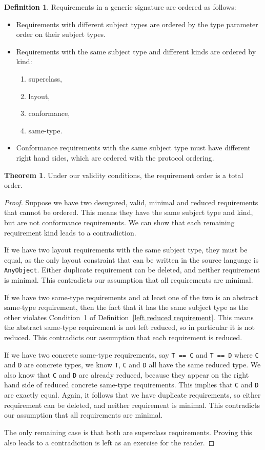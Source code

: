 \documentclass[a4paper,headsepline,bibliography=totoc,toc=flat,fleqn,twoside=semi]{scrbook}
\theoremstyle{definition}
\newtheorem{definition}{Definition}[chapter]
\theoremstyle{definition}
\theoremstyle{definition}
\newtheorem{theorem}{Theorem}[chapter]
\begin{document}
\begin{definition}\label{requirement order}
Requirements in a generic signature are ordered as follows:
\begin{itemize}
\item Requirements with different subject types are ordered by the type parameter order on their subject types.
\item Requirements with the same subject type and different kinds are ordered by kind:
\begin{enumerate}
\item superclass,
\item layout,
\item conformance,
\item same-type.
\end{enumerate}
\item Conformance requirements with the same subject type must have different right hand sides, which are ordered with the protocol ordering.
\end{itemize}
\end{definition}
\begin{theorem}
Under our validity conditions, the requirement order is a total order.
\end{theorem}
\begin{proof}
Suppose we have two desugared, valid, minimal and reduced requirements that cannot be ordered. This means they have the same subject type and kind, but are not conformance requirements. We can show that each remaining requirement kind leads to a contradiction.

If we have two layout requirements with the same subject type, they must be equal, as the only layout constraint that can be written in the source language is \texttt{AnyObject}. Either duplicate requirement can be deleted, and neither requirement is minimal. This contradicts our assumption that all requirements are minimal.

If we have two same-type requirements and at least one of the two is an abstract same-type requirement, then the fact that it has the same subject type as the other violates Condition~1 of Definition~\ref{left reduced requirement}. This means the abstract same-type requirement is not left reduced, so in particular it is not reduced. This contradicts our assumption that each requirement is reduced.

If we have two concrete same-type requirements, say \texttt{T == C} and \texttt{T == D} where \texttt{C} and \texttt{D} are concrete types, we know \texttt{T}, \texttt{C} and \texttt{D} all have the same reduced type. We also know that \texttt{C} and \texttt{D} are already reduced, because they appear on the right hand side of reduced concrete same-type requirements. This implies that \texttt{C} and \texttt{D} are exactly equal. Again, it follows that we have duplicate requirements, so either requirement can be deleted, and neither requirement is minimal. This contradicts our assumption that all requirements are minimal.

The only remaining case is that both are superclass requirements. Proving this also leads to a contradiction is left as an exercise for the reader.
\end{proof}
\end{document}
